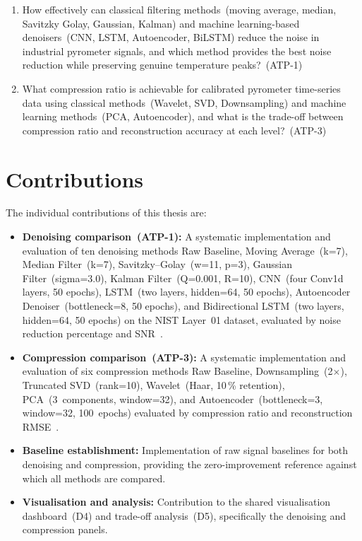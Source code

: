 \begin{enumerate}[leftmargin=2em]
\item How effectively can classical filtering methods~(moving average, median, Savitzky Golay, Gaussian, Kalman) and machine learning-based denoisers~(CNN, LSTM, Autoencoder, BiLSTM) reduce the noise in industrial pyrometer signals, and which method provides the best noise reduction while preserving genuine temperature peaks?~(ATP-1)

\item What compression ratio is achievable for calibrated pyrometer time-series data using classical methods~(Wavelet, SVD, Downsampling) and machine learning methods~(PCA, Autoencoder), and what is the trade-off between compression ratio and reconstruction accuracy at each level?~(ATP-3)
\end{enumerate}

\section{Contributions}
\label{sec:contributions}

The individual contributions of this thesis are:

\begin{itemize}[leftmargin=2em]
\item \textbf{Denoising comparison~(ATP-1):} A systematic implementation and evaluation of ten denoising methods Raw Baseline, Moving Average~(k=7), Median Filter~(k=7), Savitzky--Golay~(w=11, p=3), Gaussian Filter~(sigma=3.0), Kalman Filter~(Q=0.001, R=10), CNN~(four Conv1d layers, 50 epochs), LSTM~(two layers, hidden=64, 50 epochs), Autoencoder Denoiser~(bottleneck=8, 50 epochs), and Bidirectional LSTM~(two layers, hidden=64, 50 epochs) on the NIST Layer~01 dataset, evaluated by noise reduction percentage and SNR~\cite{kalman_wavelet_denoising}.

\item \textbf{Compression comparison~(ATP-3):} A systematic implementation and evaluation of six compression methods Raw Baseline, Downsampling~(2$\times$), Truncated SVD~(rank=10), Wavelet~(Haar, 10\,\% retention), PCA~(3~components, window=32), and Autoencoder~(bottleneck=3, window=32, 100~epochs) evaluated by compression ratio and reconstruction RMSE~\cite{lossless_compression, autoencoder_compression}.

\item \textbf{Baseline establishment:} Implementation of raw signal baselines for both denoising and compression, providing the zero-improvement reference against which all methods are compared.

\item \textbf{Visualisation and analysis:} Contribution to the shared visualisation dashboard~(D4) and trade-off analysis~(D5), specifically the denoising and compression panels.
\end{itemize}

